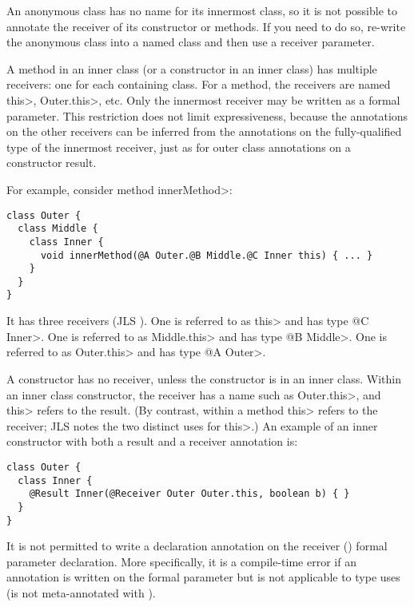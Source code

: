 \documentclass[10pt]{article}
\newcommand{\ttlcb}{\texttt{\char "7B}}
\newcommand{\ttrcb}{\texttt{\char "7D}}
\newcommand{\preverbnegspace}{\vspace{-5pt}}
\begin{document}
\begin{enumerate}
  An anonymous class has no name for its innermost class, so it is not
  possible to annotate the receiver of its constructor or methods.
  If you need to do so, re-write the
  anonymous class into a named class and then use a receiver parameter.

  A method in an inner class (or a constructor in an
  inner class) has multiple receivers:  one for
  each containing class.  For a method, the receivers are named \<this>,
  \<Outer.this>, etc.  Only the innermost receiver may be written as a
  formal parameter.  This restriction does not limit expressiveness, because
  the annotations on the other receivers can be inferred
  from the annotations on the fully-qualified type of the innermost
  receiver, just as for outer class annotations on a constructor result.

  For example, consider method \<innerMethod>:

\preverbnegspace
\begin{Verbatim}
class Outer {
  class Middle {
    class Inner {
      void innerMethod(@A Outer.@B Middle.@C Inner this) { ... }
    }
  }
}
\end{Verbatim}

\noindent
It has three receivers (JLS ).
One is referred to as \<this> and has type \<@C Inner>.
One is referred to as \<Middle.this> and has type \<@B Middle>.
One is referred to as \<Outer.this> and has type \<@A Outer>.

A constructor has no receiver, unless the constructor is in an inner class.
Within an inner class constructor, the receiver has a name such as
\<Outer.this>, and \<this> refers to the result.  (By contrast, within a
method \<this> refers to the receiver; JLS \ahref{\jlsFifteenEightThree}
notes the two distinct uses for \<this>.)
An example of an inner constructor with both a result and a receiver
annotation is:

\preverbnegspace
\begin{Verbatim}
class Outer {
  class Inner {
    @Result Inner(@Receiver Outer Outer.this, boolean b) { }
  }
}
\end{Verbatim}


It is not permitted to write a declaration annotation on the
receiver () formal parameter declaration.
More specifically, it is a compile-time error if an annotation is
written on the  formal parameter but is not applicable to type
uses (is not meta-annotated with
\code{@Target(\ttlcb ElementType.TYPE\_USE, ...\ttrcb)}).



\end{enumerate}
\end{document}
